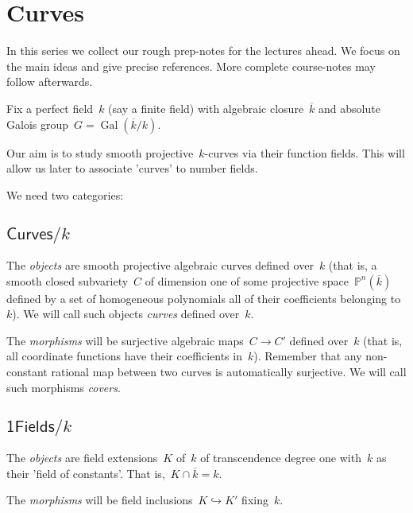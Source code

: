 \section{Curves}
In this series we collect our rough prep-notes for the lectures ahead. We focus on the main ideas and give precise references. More complete course-notes may follow afterwards.

Fix a perfect field~$k$ (say a finite field) with algebraic closure~$\overline{k}$ and absolute Galois group~$G = \operatorname{Gal}(\overline{k}/k)$.

Our aim is to study smooth projective~$k$-curves via their function fields. This will allow us later to associate 'curves' to number fields.

We need two categories:

\subsection{$\mathsf{Curves}/k$}

The \emph{objects} are smooth projective algebraic curves defined over~$k$ (that is, a smooth closed subvariety~$C$ of dimension one of some projective space~$\mathbb{P}^n(\overline{k})$ defined by a set of homogeneous polynomials all of their coefficients belonging to~$k$). We will call such objects \emph{curves} defined over~$k$.

The \emph{morphisms} will be surjective algebraic maps~$C \to C'$ defined over~$k$ (that is, all coordinate functions have their coefficients in~$k$). Remember that any non-constant rational map between two curves is automatically surjective. We will call such morphisms \emph{covers}.

\subsection{$\mathsf{1Fields}/k$}

The \emph{objects} are field extensions~$K$ of~$k$ of transcendence degree one with~$k$ as their 'field of constants'. That is,~$K \cap \overline{k} = k$.

The \emph{morphisms} will be field inclusions~$K \hookrightarrow K'$ fixing~$k$.

